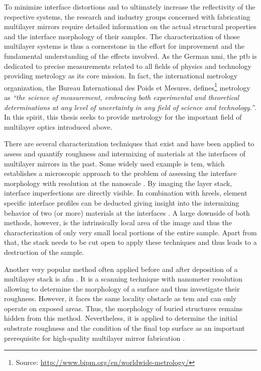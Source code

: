 To minimize interface distortions and to ultimately increase the reflectivity of the respective systems, the research and industry groups concerned with fabricating multilayer mirrors require detailed information on the actual structural properties and the interface morphology of their samples. The characterization of those multilayer systems is thus a cornerstone in the effort for improvement and the fundamental understanding of the effects involved. As the German \gls{nmi}, the \gls{ptb} is dedicated to precise measurements related to all fields of physics and technology providing metrology as its core mission. In fact, the international metrology organization, the Bureau International des Poids et Mesures, defines\footnote{Source: \url{http://www.bipm.org/en/worldwide-metrology/}} metrology as \emph{``the science of measurement, embracing both experimental and theoretical determinations at any level of uncertainty in any field of science and technology.''}. In this spirit, this thesis seeks to provide metrology for the important field of multilayer optics introduced above.

There are several characterization techniques that exist and have been applied to assess and quantify roughness and intermixing of materials at the interfaces of multilayer mirrors in the past. Some widely used example is \gls{tem}, which establishes a microscopic approach to the problem of assessing the interface morphology with resolution at the nanoscale \cite{stearns_thermally_1990, bajt_investigation_2001}. By imaging the layer stack, interface imperfections are directly visible. In combination with \gls{hreels}, element specific interface profiles can be deducted giving insight into the intermixing behavior of two (or more) materials at the interfaces \cite{egerton_electron_2011, prasciolu_thermal_2014}. A large downside of both methods, however, is the intrinsically local area of the image and thus the characterization of only very small local portions of the entire sample. Apart from that, the stack needs to be cut open to apply these techniques and thus leads to a destruction of the sample.

Another very popular method often applied before and after deposition of a multilayer stack is \gls{afm} \cite{binnig_atomic_1986}. It is a scanning technique with nanometer resolution allowing to determine the morphology of a surface and thus investigate their roughness. However, it faces the same locality obstacle as \gls{tem} and can only operate on exposed areas. Thus, the morphology of buried structures remains hidden from this method. Nevertheless, it is applied to determine the initial substrate roughness and the condition of the final top surface as an important prerequisite for high-quality multilayer mirror fabrication \cite{louis_progress_2000, bajt_investigation_2001}.

